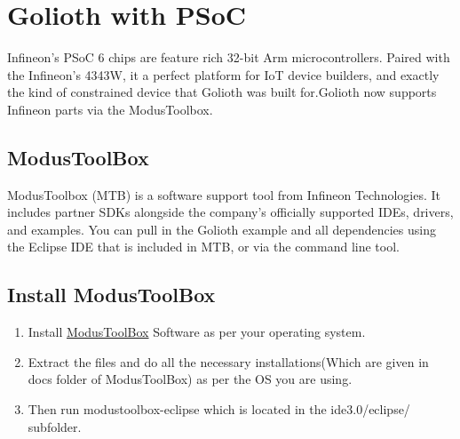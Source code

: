 \documentclass[journal,5pt,twocolumn]{IEEEtran}
\begin{document}
\section{\textbf{Golioth with PSoC}}
 \raggedright Infineon's PSoC 6 chips are feature rich 32-bit Arm microcontrollers. Paired with the Infineon's 4343W, it a perfect platform for IoT device builders, and exactly the kind of constrained device that Golioth was built for.Golioth now supports Infineon parts via the ModusToolbox.
\subsection{\textbf{ModusToolBox}}
ModusToolbox (MTB) is a software support tool from Infineon Technologies. It includes partner SDKs alongside the company's officially supported IDEs, drivers, and examples. You can pull in the Golioth example and all dependencies using the Eclipse IDE that is included in MTB, or via the command line tool.
\subsection{\textbf{Install ModusToolBox}}
\begin{enumerate}
\item Install {\href{https://www.infineon.com/cms/en/design-support/tools/sdk/modustoolbox-software/?redirId=VL1299}{ModusToolBox}} Software as per your operating system.
\item Extract the files and do all the necessary installations(Which are given in docs folder of ModusToolBox) as per the OS you are using. 
\item Then run modustoolbox-eclipse which is located in the ide3.0/eclipse/ subfolder.
 \end{enumerate}
\end{document}
